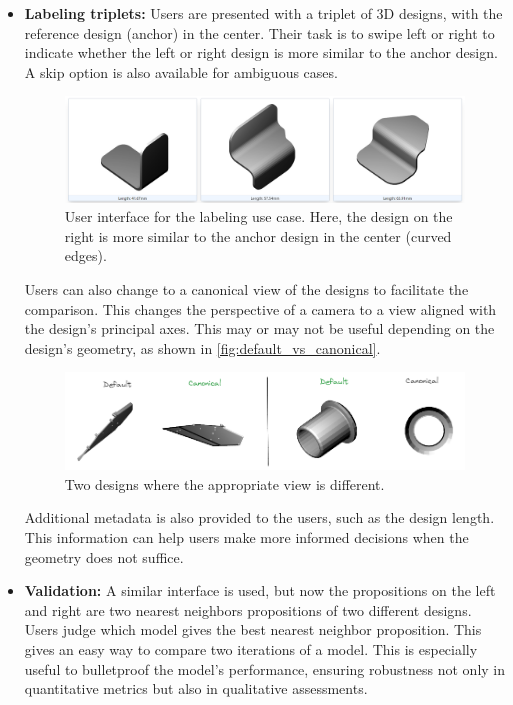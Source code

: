 \begin{itemize}
  \item \textbf{Labeling triplets:} Users are presented with a triplet of 3D designs, with the reference design (anchor) in the center. Their task is to swipe left or right to indicate whether the left or right design is more similar to the anchor design. A skip option is also available for ambiguous cases.

\begin{figure}[]
  \centering
  \includegraphics[width=0.8\columnwidth]{images/tinder3d_labeling.png}
  \caption{User interface for the labeling use case. Here, the design on the right is more similar to the anchor design in the center (curved edges).}
  \label{fig:labeling_use_case}
\end{figure}
  
  Users can also change to a canonical view of the designs to facilitate the comparison. This changes the perspective of a camera to a view aligned with the design's principal axes. This may or may not be useful depending on the design's geometry, as shown in \autoref{fig:default_vs_canonical}.

\begin{figure}[]
  \centering
  \includegraphics[width=\columnwidth]{images/default_vs_canonical.png}
  \caption{Two designs where the appropriate view is different.}
  \label{fig:default_vs_canonical}
\end{figure}

  Additional metadata is also provided to the users, such as the design length. This information can help users make more informed decisions when the geometry does not suffice.
  \item \textbf{Validation:} A similar interface is used, but now the propositions on the left and right are two nearest neighbors propositions of two different designs. Users judge which model gives the best nearest neighbor proposition. This gives an easy way to compare two iterations of a model. This is especially useful to bulletproof the model's performance, ensuring robustness not only in quantitative metrics but also in qualitative assessments.
  
\end{itemize}


